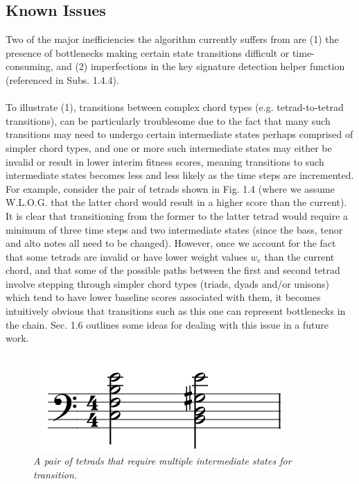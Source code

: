 \documentclass[twoside]{article}
\begin{document}
	\subsection{Known Issues}
	Two of the major inefficiencies the algorithm currently suffers from are (1) the presence of bottlenecks making certain state transitions difficult or time-consuming, and (2) imperfections in the key signature detection helper function (referenced in Subs. 1.4.4).
	\\\\
	To illustrate (1), transitions between complex chord types (e.g. tetrad-to-tetrad transitions), can be particularly troublesome due to the fact that many such transitions may need to undergo certain intermediate states perhaps comprised of simpler chord types, and one or more such intermediate states may either be invalid or result in lower interim fitness scores, meaning transitions to such intermediate states becomes less and less likely as the time steps are incremented. For example, consider the pair of tetrads shown in Fig. 1.4 (where we assume W.L.O.G. that the latter chord would result in a higher score than the current). It is clear that transitioning from the former to the latter tetrad would require a minimum of three time steps and two intermediate states (since the bass, tenor and alto notes all need to be changed). However, once we account for the fact that some tetrads are invalid or have lower weight values $w_e$ than the current chord, and that some of the possible paths between the first and second tetrad involve stepping through simpler chord types (triads, dyads and/or unisons) which tend to have lower baseline scores associated with them, it becomes intuitively obvious that transitions such as this one can represent bottlenecks in the chain. Sec. 1.6 outlines some ideas for dealing with this issue in a future work.
	\begin{figure}[h]  %
		\begin{center}  
			\includegraphics[scale=0.8]{Fig1_4.png}  
			\caption{\small \sl A pair of tetrads that require multiple intermediate states for transition.}
		\end{center}  
	\end{figure}
\end{document}

